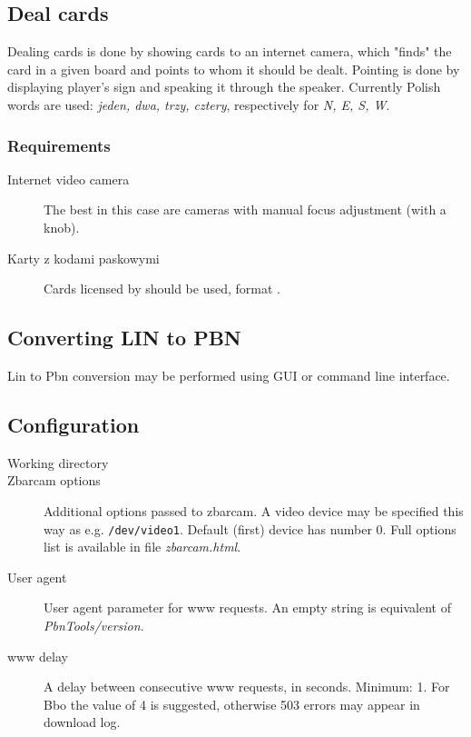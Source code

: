 \documentclass[polish,a4paper,11pt,oneside]{article}
\begin{document}
\subsection{Deal cards} \label{rozdaj}

Dealing cards is done by showing cards to an internet camera,
which "finds" the card in a given board and points to whom it should be dealt.
Pointing is done by displaying player's sign and speaking it through the speaker.
Currently Polish words are used: {\em jeden, dwa, trzy, cztery},
respectively for {\em N, E, S, W}. %

\subsubsection{Requirements}
\begin{description}
\item[Internet video camera]
  The best in this case are cameras with manual focus adjustment (with a knob).
  
\item[Karty z kodami paskowymi]
  Cards licensed by 
  should be used, format .
\end{description}

\subsection{Converting LIN to PBN}

Lin to Pbn conversion may be performed using GUI or command line
interface.


\subsection{Configuration} \label{konfig} %

\begin{description}
\item[Working directory]
\item[Zbarcam options]
  Additional options passed to zbarcam.
  A video device may be specified this way as e.g. \verb!/dev/video1!.
  Default (first) device has number 0.
  Full options list is available in file {\em zbarcam.html}.
\item[User agent]
  User agent parameter for www requests. An empty string is equivalent of
  {\em PbnTools/version}.
\item[www delay]
  A delay between consecutive www requests, in seconds.
  Minimum: 1. For Bbo the value of 4 is suggested,
  otherwise 503 errors may appear in download log.

\end{description}
\end{document}

